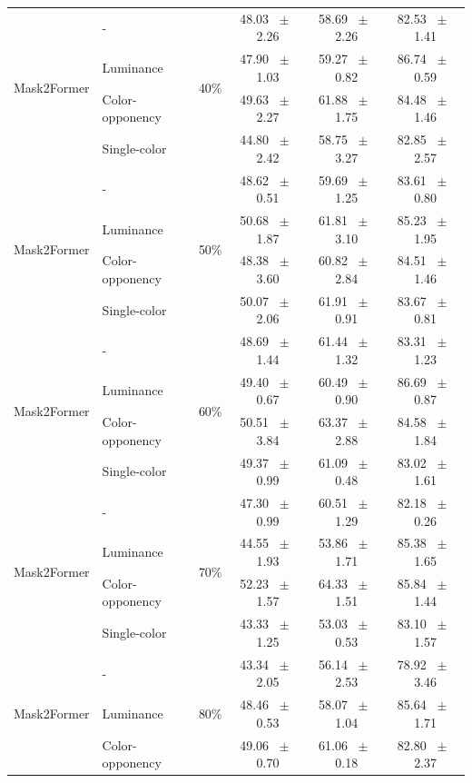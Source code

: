 \begin{table}[h]
\begin{tabular}{@{}l l c c c c@{}}
    \multirow{4}{*}{Mask2Former} & - & \multirow{4}{*}{40\%} & 48.03 ~$\pm$~ 2.26 & 58.69 ~$\pm$~ 2.26 & 82.53 ~$\pm$~ 1.41 \\
    & Luminance &  & 47.90 ~$\pm$~ 1.03 & 59.27 ~$\pm$~ 0.82 & 86.74 ~$\pm$~ 0.59 \\
    & Color-opponency &  & 49.63 ~$\pm$~ 2.27 & 61.88 ~$\pm$~ 1.75 & 84.48 ~$\pm$~ 1.46 \\
    & Single-color &  & 44.80 ~$\pm$~ 2.42 & 58.75 ~$\pm$~ 3.27 & 82.85 ~$\pm$~ 2.57 \\
    \midrule
    \multirow{4}{*}{Mask2Former} & - & \multirow{4}{*}{50\%} & 48.62 ~$\pm$~ 0.51 & 59.69 ~$\pm$~ 1.25 & 83.61 ~$\pm$~ 0.80 \\
    & Luminance &  & 50.68 ~$\pm$~ 1.87 & 61.81 ~$\pm$~ 3.10 & 85.23 ~$\pm$~ 1.95 \\
    & Color-opponency &  & 48.38 ~$\pm$~ 3.60 & 60.82 ~$\pm$~ 2.84 & 84.51 ~$\pm$~ 1.46 \\
    & Single-color &  & 50.07 ~$\pm$~ 2.06 & 61.91 ~$\pm$~ 0.91 & 83.67 ~$\pm$~ 0.81 \\
    \midrule
    \multirow{4}{*}{Mask2Former} & - & \multirow{4}{*}{60\%} & 48.69 ~$\pm$~ 1.44 & 61.44 ~$\pm$~ 1.32 & 83.31 ~$\pm$~ 1.23 \\
    & Luminance &  & 49.40 ~$\pm$~ 0.67 & 60.49 ~$\pm$~ 0.90 & 86.69 ~$\pm$~ 0.87 \\
    & Color-opponency &  & 50.51 ~$\pm$~ 3.84 & 63.37 ~$\pm$~ 2.88 & 84.58 ~$\pm$~ 1.84 \\
    & Single-color &  & 49.37 ~$\pm$~ 0.99 & 61.09 ~$\pm$~ 0.48 & 83.02 ~$\pm$~ 1.61 \\
    \midrule
    \multirow{4}{*}{Mask2Former} & - & \multirow{4}{*}{70\%} & 47.30 ~$\pm$~ 0.99 & 60.51 ~$\pm$~ 1.29 & 82.18 ~$\pm$~ 0.26 \\
    & Luminance &  & 44.55 ~$\pm$~ 1.93 & 53.86 ~$\pm$~ 1.71 & 85.38 ~$\pm$~ 1.65 \\
    & Color-opponency &  & 52.23 ~$\pm$~ 1.57 & 64.33 ~$\pm$~ 1.51 & 85.84 ~$\pm$~ 1.44 \\
    & Single-color &  & 43.33 ~$\pm$~ 1.25 & 53.03 ~$\pm$~ 0.53 & 83.10 ~$\pm$~ 1.57 \\
    \midrule
    \multirow{4}{*}{Mask2Former} & - & \multirow{4}{*}{80\%} & 43.34 ~$\pm$~ 2.05 & 56.14 ~$\pm$~ 2.53 & 78.92 ~$\pm$~ 3.46 \\
    & Luminance &  & 48.46 ~$\pm$~ 0.53 & 58.07 ~$\pm$~ 1.04 & 85.64 ~$\pm$~ 1.71 \\
    & Color-opponency &  & 49.06 ~$\pm$~ 0.70 & 61.06 ~$\pm$~ 0.18 & 82.80 ~$\pm$~ 2.37 \\

\end{tabular}
\end{table}
